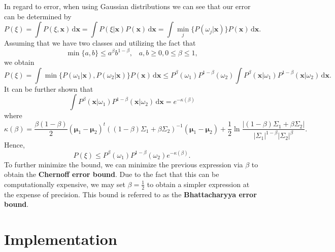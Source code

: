\documentclass[ 12pt ]{article}
\begin{document}
In regard to error, when using Gaussian distributions we can see that our error can be determined by $$P(\xi) = \int P(\xi, \textbf{x})\, \mathrm{d}\textbf{x} = \int P(\xi | \textbf{x})
P(\textbf{x})\, \mathrm{d}\textbf{x} = \int \min_j \{ P(\omega_j | \textbf{x}) \} P(\textbf{x})\, \mathrm{d}\textbf{x}.$$ Assuming that we have two classes and utilizing the fact that
$$\min \{ a, b \} \leq a^\beta b^{1-\beta},\;\;\; a, b \geq 0, 0 \leq \beta \leq 1,$$ we obtain $$P(\xi) = \int \min \{ P(\omega_1 | \textbf{x}), P(\omega_2 | \textbf{x}) \} P(\textbf{x}
)\, \mathrm{d}\textbf{x} \leq P^\beta(\omega_1) P^{1 - \beta}(\omega_2) \int P^\beta(\textbf{x} | \omega_1) P^{1 - \beta}(\textbf{x} | \omega_2)\, \mathrm{d}\textbf{x}.$$ It can be
further shown that $$\int P^\beta(\textbf{x} | \omega_1) P^{1 - \beta}(\textbf{x} | \omega_2)\, \mathrm{d}\textbf{x} = e^{-\kappa(\beta)}$$ where $$\kappa(\beta) = \frac{\beta(1 -
\beta)}{2}(\mathbf{\mu}_1 - \mathbf{\mu}_2)^t ((1- \beta)\Sigma_1 + \beta \Sigma_2)^{-1} (\mathbf{\mu}_1 - \mathbf{\mu}_2) + \frac{1}{2} \ln \frac{|(1 - \beta) \Sigma_1 + \beta
\Sigma_2|}{|\Sigma_1|^{1 - \beta} |\Sigma_2|^\beta}.$$ Hence, $$P(\xi) \leq P^\beta(\omega_1) P^{1 - \beta}(\omega_2) e^{-\kappa(\beta)}.$$ To further minimize the bound, we can minimize
the previous expression via $\beta$ to obtain the \textbf{Chernoff error bound}. Due to the fact that this can be computationally expensive, we may set $\beta = \frac{1}{2}$ to obtain a
simpler expression at the expense of precision. This bound is referred to as the \textbf{Bhattacharyya error bound}.

\section*{Implementation}
\end{document}
